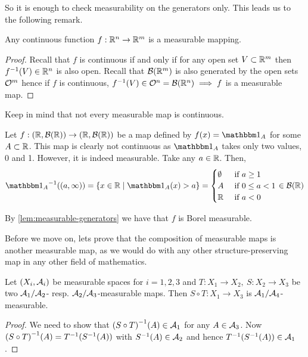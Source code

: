 So it is enough to check measurability on the generators only. This leads us to the following remark.

\begin{remark}
	Any continuous function $f: \mathbb{R}^n \to \mathbb{R}^m$ is a measurable mapping.
\end{remark}

\begin{proof}
	Recall that $f$ is continuous if and only if for any open set $V \subset \mathbb{R}^m$ then ${f}^{-1}(V) \in \mathbb{R}^n$ is also open. Recall that $\mathcal{B}(\mathbb{R}^m)$ is also generated by the open sets $\mathcal{O}^m$ hence if $f$ is continuous, ${f}^{-1}(V) \in \mathcal{O}^n = \mathcal{B}(\mathbb{R}^n) \implies f$ is a measurable map.
\end{proof}

Keep in mind that not every measurable map is continuous.

\begin{eg}
	Let $f:(\mathbb{R}, \mathcal{B}(\mathbb{R})) \to (\mathbb{R}, \mathcal{B}(\mathbb{R}))$ be a map defined by $f(x) = \ind_{A}$ for some $A \subset \mathbb{R}$. This map is clearly not continuous as $\ind_A$ takes only two values, 0 and 1. However, it is indeed measurable. Take any $a \in \mathbb{R}$. Then,
	\begin{align*}
		\inv{\ind_A}((a, \infty)) = \{x \in \R \mid \ind_A(x) > a\} =
		\begin{cases}
		\emptyset \tif a \geq 1 \\
		A \tif 0 \leq a < 1 \\
		\R \tif a < 0
		\end{cases} \in \borel(\R)
	\end{align*}
	
	By \autoref{lem:measurable-generators} we have that $f$ is Borel measurable.
\end{eg}

Before we move on, lets prove that the composition of measurable maps is another measurable map, as we would do with any other structure-preserving map in any other field of mathematics.

\begin{thm}
	Let $(X_i, \mathcal{A}_i)$ be measurable spaces for $i = 1, 2, 3$ and $T: X_1 \to X_2,\ S: X_2 \to X_3$ be two $\mathcal{A}_1/\mathcal{A}_2$- resp. $\mathcal{A}_2/\mathcal{A}_3$-measurable maps. Then $S \circ T: X_1 \to X_3$ is $\mathcal{A}_1/\mathcal{A}_4$-measurable.
\end{thm}

\begin{proof}
	We need to show that ${(S \circ T)}^{-1}(A) \in \mathcal{A}_1$ for any $A \in \mathcal{A}_3$. Now ${(S \circ T)}^{-1}(A) = {T}^{-1}({S}^{-1}(A))$ with ${S}^{-1}(A) \in \mathcal{A}_2$ and hence ${T}^{-1}({S}^{-1}(A)) \in \mathcal{A}_1$.
\end{proof}

